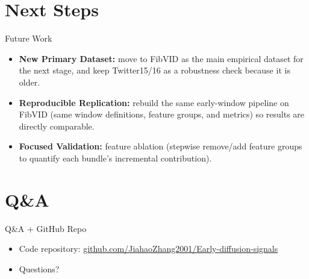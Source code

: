 \documentclass{beamer}
\begin{document}
\section{Next Steps}
\begin{frame}{Future Work}
\begin{itemize}
\item \textbf{New Primary Dataset:} move to FibVID as the main empirical dataset for the next stage, and keep Twitter15/16 as a robustness check because it is older.
\item \textbf{Reproducible Replication:} rebuild the same early-window pipeline on FibVID (same window definitions, feature groups, and metrics) so results are directly comparable.
\item \textbf{Focused Validation:} feature ablation (stepwise remove/add feature groups to quantify each bundle's incremental contribution).
\end{itemize}
\end{frame}

\section{Q\&A}
\begin{frame}{Q\&A + GitHub Repo}
\begin{itemize}
\item Code repository: \href{https://github.com/JiahaoZhang2001/Early-diffusion-signals}{github.com/JiahaoZhang2001/Early-diffusion-signals}
\item Questions?
\end{itemize}
\end{frame}
\end{document}
